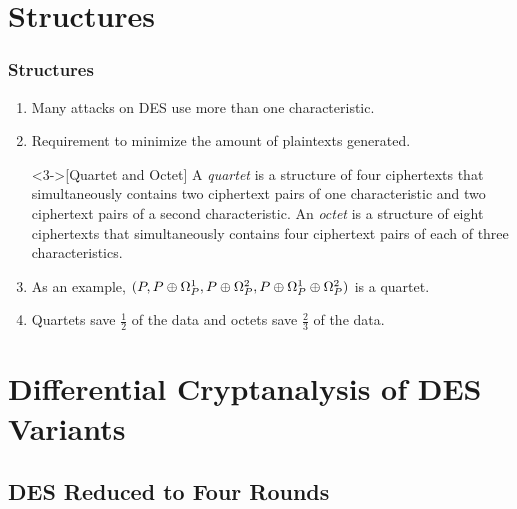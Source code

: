 \documentclass{beamer}
\begin{document}
	\section{Structures}

	\begin{frame}
		\frametitle{Structures}
		\begin{enumerate}
			\item<1-> Many attacks on DES use more than one characteristic.
			\item<2-> Requirement to minimize the amount of plaintexts generated.
			\begin{definition}<3->[Quartet and Octet]
				A \emph{quartet} is a structure of four ciphertexts that
				simultaneously contains two ciphertext pairs of one
				characteristic and two ciphertext pairs of a second
				characteristic. An \emph{octet} is a structure of eight
				ciphertexts that simultaneously contains four ciphertext pairs
				of each of three characteristics.
			\end{definition}
			\item<3-> As an example, \((P, P \oplus \Omega_P^1, P \oplus
			\Omega_P^2, P \oplus \Omega_P^1 \oplus \Omega_P^2)\) is a quartet.
			\item<4-> Quartets save \(\frac{1}{2}\) of the data and octets save
			\(\frac{2}{3}\) of the data.
		\end{enumerate}
	\end{frame}

	\section[Cryptanalysis]{Differential Cryptanalysis of DES Variants}

	\subsection{DES Reduced to Four Rounds}
\end{document}
